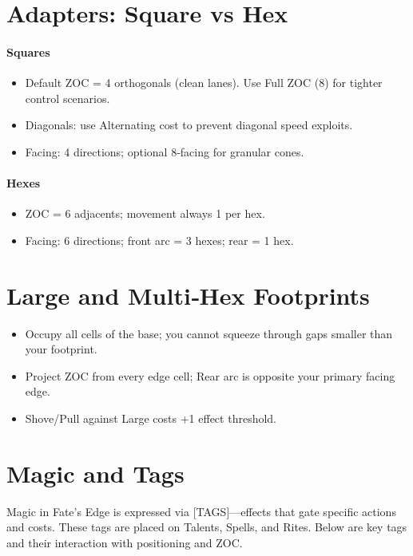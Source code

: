 \documentclass[11pt]{article}
\begin{document}
\section{Adapters: Square vs Hex}\label{sec:adapters}
\paragraph{Squares}
\begin{itemize}
  \item Default ZOC = 4 orthogonals (clean lanes). Use Full ZOC (8) for tighter control scenarios.
  \item Diagonals: use Alternating cost to prevent diagonal speed exploits.
  \item Facing: 4 directions; optional 8‑facing for granular cones.
\end{itemize}
\paragraph{Hexes}
\begin{itemize}
  \item ZOC = 6 adjacents; movement always 1 per hex.
  \item Facing: 6 directions; front arc = 3 hexes; rear = 1 hex.
\end{itemize}

\section{Large and Multi‑Hex Footprints}
\begin{itemize}
  \item Occupy all cells of the base; you cannot squeeze through gaps smaller than your footprint.
  \item Project ZOC from every edge cell; Rear arc is opposite your primary facing edge.
  \item Shove/Pull against Large costs +1 effect threshold.
\end{itemize}

\section{Magic and Tags}\label{sec:magic}
Magic in Fate’s Edge is expressed via [TAGS]—effects that gate specific actions and costs. These tags are placed on Talents, Spells, and Rites. Below are key tags and their interaction with positioning and ZOC.
\end{document}
